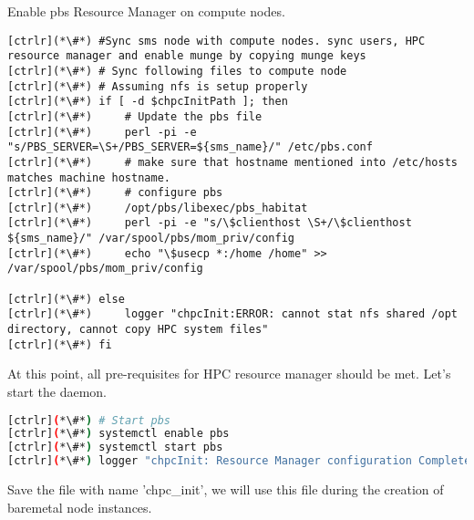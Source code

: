      Enable pbs Resource Manager on compute nodes.


\begin{lstlisting}
[ctrlr](*\#*) #Sync sms node with compute nodes. sync users, HPC resource manager and enable munge by copying munge keys
[ctrlr](*\#*) # Sync following files to compute node
[ctrlr](*\#*) # Assuming nfs is setup properly
[ctrlr](*\#*) if [ -d $chpcInitPath ]; then
[ctrlr](*\#*)     # Update the pbs file
[ctrlr](*\#*)     perl -pi -e "s/PBS_SERVER=\S+/PBS_SERVER=${sms_name}/" /etc/pbs.conf
[ctrlr](*\#*)     # make sure that hostname mentioned into /etc/hosts matches machine hostname. 
[ctrlr](*\#*)     # configure pbs
[ctrlr](*\#*)     /opt/pbs/libexec/pbs_habitat
[ctrlr](*\#*)     perl -pi -e "s/\$clienthost \S+/\$clienthost ${sms_name}/" /var/spool/pbs/mom_priv/config
[ctrlr](*\#*)     echo "\$usecp *:/home /home" >> /var/spool/pbs/mom_priv/config 

[ctrlr](*\#*) else
[ctrlr](*\#*)     logger "chpcInit:ERROR: cannot stat nfs shared /opt directory, cannot copy HPC system files"
[ctrlr](*\#*) fi
\end{lstlisting}

	At this point, all pre-requisites for HPC resource manager should be met. Let's start the daemon.


\begin{lstlisting}[language=bash,keywords={}]
[ctrlr](*\#*) # Start pbs 
[ctrlr](*\#*) systemctl enable pbs
[ctrlr](*\#*) systemctl start pbs
[ctrlr](*\#*) logger "chpcInit: Resource Manager configuration Complete"
\end{lstlisting}

	Save the file with name 'chpc\_init', we will use this file during the creation of baremetal node instances.

